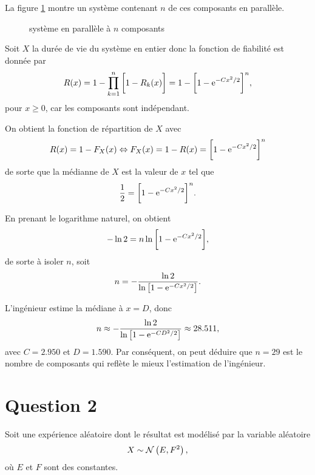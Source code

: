\documentclass[11pt]{article}
\newcommand\Norm[2]{%
	\ensuremath{%
		\mathcal{N}\left(#1,#2\right)%
	}%
}%
\newcommand\e{%
    \ensuremath{%
        \mathrm{e}%
    }%
}
\begin{document}
La figure \ref{fig:sys_parallel} montre un système contenant $n$ de ces
composants en parallèle.
\begin{figure}[H]
    \centering
    
    \caption{système en parallèle à $n$ composants}
    \label{fig:sys_parallel}
\end{figure}

Soit $X$ la durée de vie du système en entier donc la fonction de
fiabilité est donnée par
\begin{equation*}
    R(x)
    =1-\prod_{k=1}^n\bigg[1-R_k(x)\bigg]
    =1-\bigg[1-\e^{-Cx^2/2}\bigg]^n,
\end{equation*}
pour $x\geq 0$, car les composants sont indépendant.

On obtient la fonction de répartition de $X$ avec
\begin{equation*}
    R(x)=1-F_X(x)\Leftrightarrow
    F_X(x)=1-R(x)=\bigg[1-\e^{-Cx^2/2}\bigg]^n
\end{equation*}
de sorte que la médianne de $X$ est la valeur de $x$ tel que
\begin{equation*}
    \frac{1}{2}=\bigg[1-\e^{-Cx^2/2}\bigg]^n.
\end{equation*}

En prenant le logarithme naturel, on obtient
\begin{equation*}
    -\ln{2}=n\ln\bigg[1-\e^{-Cx^2/2}\bigg],
\end{equation*}
de sorte à isoler $n$, soit
\begin{equation*}
    n=-\frac{\ln{2}}{\ln\big[1-\e^{-Cx^2/2}\big]}.
\end{equation*}

L'ingénieur estime la médiane à $x=D$, donc
\begin{equation*}
    n
    \approx-\frac{\ln{2}}{\ln\big[1-\e^{-CD^2/2}\big]}
    \approx{28.511},
\end{equation*}
avec $C=2.950$ et $D=1.590$. Par conséquent, on peut déduire que
$n=29$ est le nombre de composants qui reflète le mieux l'estimation
de l'ingénieur.

\pagebreak
\section*{Question 2}
Soit une expérience aléatoire dont le résultat est modélisé par
la variable aléatoire
\begin{equation*}
    X\sim\Norm{E}{F^2},
\end{equation*}
où $E$ et $F$ sont des constantes.
\end{document}
